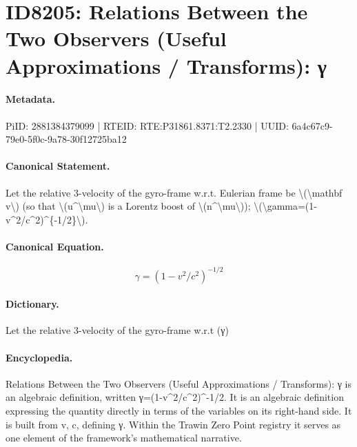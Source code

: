 \section*{ID8205: Relations Between the Two Observers (Useful Approximations / Transforms): γ}
\paragraph{Metadata.}
PiID: 2881384379099 | RTEID: RTE:P31861.8371:T2.2330 | UUID: 6a4c67c9-79e0-5f0c-9a78-30f12725ba12

\paragraph{Canonical Statement.}
Let the relative 3-velocity of the gyro-frame w.r.t. Eulerian frame be \textbackslash{}(\textbackslash{}mathbf v\textbackslash{}) (so that \textbackslash{}(u\textasciicircum{}\textbackslash{}mu\textbackslash{}) is a Lorentz boost of \textbackslash{}(n\textasciicircum{}\textbackslash{}mu\textbackslash{})); \textbackslash{}(\textbackslash{}gamma=(1-v\textasciicircum{}2/c\textasciicircum{}2)\textasciicircum{}\{-1/2\}\textbackslash{}).

\paragraph{Canonical Equation.}
\[
\gamma=(1-v^2/c^2)^{-1/2}
\]

\paragraph{Dictionary.}
Let the relative 3-velocity of the gyro-frame w.r.t (γ)

\paragraph{Encyclopedia.}
Relations Between the Two Observers (Useful Approximations / Transforms): γ is an algebraic definition, written γ=(1-v\textasciicircum{}2/c\textasciicircum{}2)\textasciicircum{}-1/2. It is an algebraic definition expressing the quantity directly in terms of the variables on its right-hand side. It is built from v, c, defining γ. Within the Trawin Zero Point registry it serves as one element of the framework's mathematical narrative.
